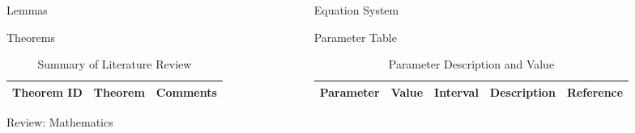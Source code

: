 \begin{frame}[t]
\begin{columns}[t]
\begin{column}{\onecolwid}
\begin{alertblock}{Lemmas}
\end{alertblock}
\begin{alertblock}{Theorems}

\begin{table}[H]
	\centering
	\begin{tabular}{r|p{12cm}|l}
	\hline
	Theorem ID  & Theorem & Comments \\
	\hline
	\hline
	\end{tabular}
	\caption{Summary of Literature Review}
\end{table} 


\end{alertblock}
\begin{alertblock}{Review: Mathematics}
\end{alertblock}
\end{column}
\begin{column}{\onecolwid} %
\begin{alertblock}{Equation System}
\end{alertblock}
\begin{alertblock}{Parameter Table}

\vspace{4pt}
\centering
\begin{table}[h]\footnotesize
	\caption{Parameter Description and Value}
	\begin{tabular}{rllp{2cm}l}
		\hline	
		Parameter & Value & Interval & Description & Reference \\
		\hline 
	\end{tabular}	
\end{table}



\end{alertblock}
\end{column}
\end{columns}
\end{frame}
